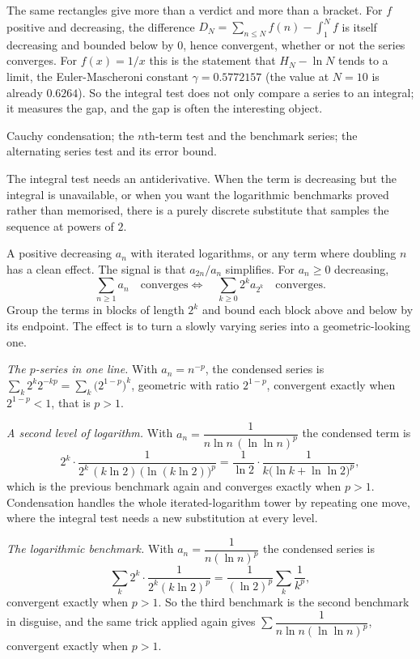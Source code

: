 The same rectangles give more than a verdict and more than a bracket. For $f$ positive and decreasing, the difference $D_N=\sum_{n\leq N}f(n)-\int_1^{N}f$ is itself decreasing and bounded below by $0$, hence convergent, whether or not the series converges. For $f(x)=1/x$ this is the statement that $H_N-\ln N$ tends to a limit, the Euler-Mascheroni constant $\gamma=0.5772157$ (the value at $N=10$ is already $0.6264$). So the integral test does not only compare a series to an integral; it measures the gap, and the gap is often the interesting object.

\begin{seealsob}Cauchy condensation; the $n$th-term test and the benchmark series; the alternating series test and its error bound.\end{seealsob}

The integral test needs an antiderivative. When the term is decreasing but the integral is unavailable, or when you want the logarithmic benchmarks proved rather than memorised, there is a purely discrete substitute that samples the sequence at powers of $2$.

\cue A positive decreasing $a_n$ with iterated logarithms, or any term where doubling $n$ has a clean effect. The signal is that $a_{2n}/a_n$ simplifies.
\method For $a_n\geq0$ decreasing,
\[\sum_{n\geq1}a_n\quad\text{converges}\iff\quad\sum_{k\geq0}2^{k}a_{2^{k}}\quad\text{converges}.\]
Group the terms in blocks of length $2^k$ and bound each block above and below by its endpoint. The effect is to turn a slowly varying series into a geometric-looking one.

\begin{worked}
\emph{The $p$-series in one line.} With $a_n=n^{-p}$, the condensed series is $\sum_k2^k2^{-kp}=\sum_k\bigl(2^{1-p}\bigr)^{k}$, geometric with ratio $2^{1-p}$, convergent exactly when $2^{1-p}<1$, that is $p>1$.

\emph{A second level of logarithm.} With $a_n=\dfrac{1}{n\ln n\,(\ln\ln n)^{p}}$ the condensed term is
\[2^{k}\cdot\frac{1}{2^{k}\,(k\ln2)\,\bigl(\ln(k\ln2)\bigr)^{p}}=\frac{1}{\ln2}\cdot\frac{1}{k\bigl(\ln k+\ln\ln2\bigr)^{p}},\]
which is the previous benchmark again and converges exactly when $p>1$. Condensation handles the whole iterated-logarithm tower by repeating one move, where the integral test needs a new substitution at every level.

\emph{The logarithmic benchmark.} With $a_n=\dfrac{1}{n(\ln n)^{p}}$ the condensed series is
\[\sum_{k}2^{k}\cdot\frac{1}{2^{k}(k\ln2)^{p}}=\frac{1}{(\ln2)^{p}}\sum_{k}\frac{1}{k^{p}},\]
convergent exactly when $p>1$. So the third benchmark is the second benchmark in disguise, and the same trick applied again gives $\sum\dfrac{1}{n\ln n(\ln\ln n)^{p}}$, convergent exactly when $p>1$.
\end{worked}


